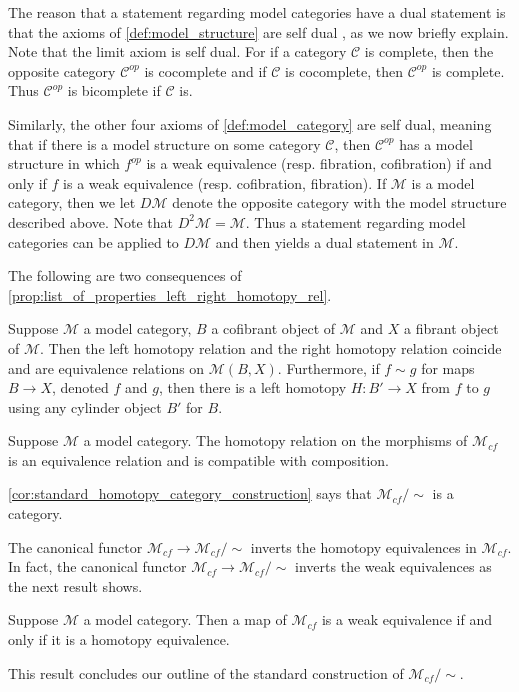 The reason that a statement regarding model categories have a dual statement is that the axioms of \cref{def:model_structure} are self dual \cite[Rem.~1.1.7, p.~4]{Ho99}, as we now briefly explain. Note that the limit axiom is self dual. For if a category $\mathscr{C}$ is complete, then the opposite category $\mathscr{C} ^{op}$ is cocomplete and if $\mathscr{C}$ is cocomplete, then $\mathscr{C} ^{op}$ is complete. Thus $\mathscr{C} ^{op}$ is bicomplete if $\mathscr{C}$ is.

Similarly, the other four axioms of \cref{def:model_category} are self dual, meaning that if there is a model structure on some category $\mathscr{C}$, then $\mathscr{C} ^{op}$ has a model structure in which $f^{op}$ is a weak equivalence (resp. fibration, cofibration) if and only if $f$ is a weak equivalence (resp. cofibration, fibration). If $\mathscr{M}$ is a model category, then we let $D\mathscr{M}$ denote the opposite category with the model structure described above. Note that $D^2\mathscr{M} =\mathscr{M}$. Thus a statement regarding model categories can be applied to $D\mathscr{M}$ and then yields a dual statement in $\mathscr{M}$.

The following are two consequences of \cref{prop:list_of_properties_left_right_homotopy_rel}.
\begin{corollary}
Suppose $\mathscr{M}$ a model category, $B$ a cofibrant object of $\mathscr{M}$ and $X$ a fibrant object of $\mathscr{M}$. Then the left homotopy relation and the right homotopy relation coincide and are equivalence relations on $\mathscr{M} (B,X)$. Furthermore, if $f\sim g$ for maps $B\to X$, denoted $f$ and $g$, then there is a left homotopy $H:B'\to X$ from $f$ to $g$ using any cylinder object $B'$ for $B$.
\end{corollary}
\begin{corollary}\label{cor:standard_homotopy_category_construction}
Suppose $\mathscr{M}$ a model category. The homotopy relation on the morphisms of $\mathscr{M} _{cf}$ is an equivalence relation and is compatible with composition.
\end{corollary}
\noindent \cref{cor:standard_homotopy_category_construction} says that $\mathscr{M} _{cf}/\sim$ is a category.

The canonical functor $\mathscr{M} _{cf} \to \mathscr{M} _{cf}/\sim$ inverts the homotopy equivalences in $\mathscr{M} _{cf}$. In fact, the canonical functor $\mathscr{M} _{cf} \to \mathscr{M} _{cf}/\sim$ inverts the weak equivalences as the next result shows.
\begin{proposition}\label{prop:weak_eq_coincide_homotopy_eq_cf}
Suppose $\mathscr{M}$ a model category. Then a map of $\mathscr{M} _{cf}$ is a weak equivalence if and only if it is a homotopy equivalence.
\end{proposition}
\noindent This result concludes our outline of the standard construction of $\mathscr{M} _{cf}/\sim$.

